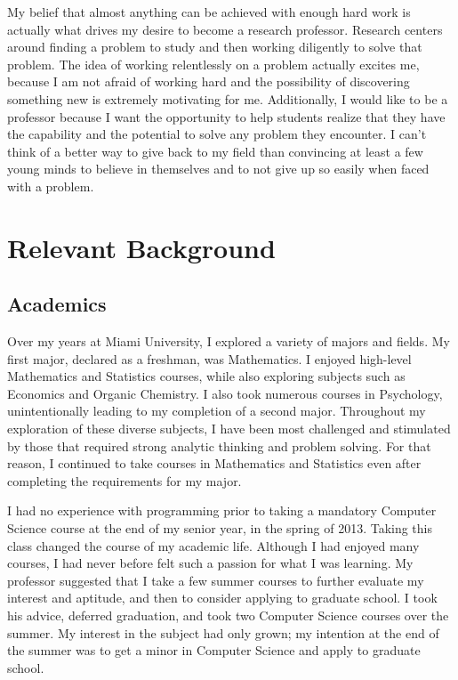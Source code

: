 \documentclass[12pt]{article}
\begin{document}
My belief that almost anything can be achieved with enough hard work is actually what drives my desire to become a research professor. 
Research centers around finding a problem to study and then working diligently to solve that problem.
The idea of working relentlessly on a problem actually excites me, because I am not afraid of working hard and the possibility of discovering something new is extremely motivating for me.
Additionally, I would like to be a professor because I want the opportunity to help students realize that they have the capability and the potential to solve any problem they encounter.
I can't think of a better way to give back to my field than convincing at least a few young minds to believe in themselves and to not give up so easily when faced with a problem.


\section*{Relevant Background}
\subsection{Academics}
Over my years at Miami University, I explored a variety of majors and fields. 
My first major, declared as a freshman, was Mathematics. 
I enjoyed high-level Mathematics and Statistics courses, while also exploring subjects such as Economics and Organic Chemistry. 
I also took numerous courses in Psychology, unintentionally leading to my completion of a second major.
Throughout my exploration of these diverse subjects, I have been most challenged and stimulated by those that required strong analytic thinking and problem solving. 
For that reason, I continued to take courses in Mathematics and Statistics even after completing the requirements for my major.

I had no experience with programming prior to taking a mandatory Computer Science course at the end of my senior year, in the spring of 2013. 
Taking this class changed the course of my academic life. 
Although I had enjoyed many courses, I had never before felt such a passion for what I was learning. 
My professor suggested that I take a few summer courses to further evaluate my interest and aptitude, and then to consider applying to graduate school.
I took his advice, deferred graduation, and took two Computer Science courses over the summer.  
My interest in the subject had only grown;
my intention at the end of the summer was to get a minor in Computer Science and apply to graduate school. 
\end{document}

